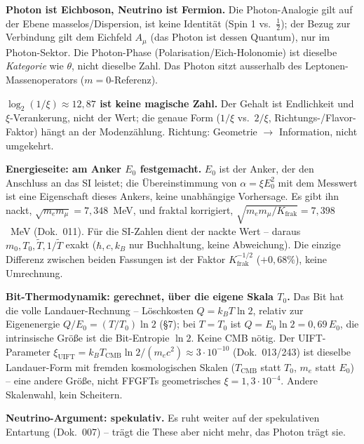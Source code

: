 \textbf{Photon ist Eichboson, Neutrino ist Fermion.} Die Photon-Analogie gilt auf der Ebene
masselos/Dispersion, ist keine Identität (Spin 1 vs.\ $\tfrac12$); der Bezug zur Verbindung gilt dem Eichfeld $A_\mu$ (das Photon ist dessen Quantum), nur im
Photon-Sektor. Die Photon-Phase (Polarisation/Eich-Holonomie) ist dieselbe \emph{Kategorie} wie $\theta$,
nicht dieselbe Zahl. Das Photon sitzt ausserhalb des Leptonen-Massenoperators ($m=0$-Referenz).

\textbf{$\log_2(1/\xi)\approx12{,}87$ ist keine magische Zahl.} Der Gehalt ist Endlichkeit und
$\xi$-Verankerung, nicht der Wert; die genaue Form ($1/\xi$ vs.\ $2/\xi$, Richtungs-/Flavor-Faktor) hängt
an der Modenzählung. Richtung: Geometrie $\to$ Information, nicht umgekehrt.

\textbf{Energieseite: am Anker $E_0$ festgemacht.} $E_0$ ist der Anker, der den Anschluss an das SI
leistet; die Übereinstimmung von $\alpha=\xi E_0^2$ mit dem Messwert ist eine Eigenschaft dieses Ankers,
keine unabhängige Vorhersage. Es gibt ihn nackt, $\sqrt{m_e m_\mu}=7{,}348$~MeV, und fraktal korrigiert,
$\sqrt{m_e m_\mu/K_{\text{frak}}}=7{,}398$~MeV (Dok.~011). Für die SI-Zahlen dient der nackte Wert --
daraus $m_0,T_0,\tilde T,1/\tilde T$ exakt ($\hbar,c,k_B$ nur Buchhaltung, keine Abweichung). Die einzige
Differenz zwischen beiden Fassungen ist der Faktor $K_{\text{frak}}^{-1/2}$ ($+0{,}68\%$), keine
Umrechnung.

\textbf{Bit-Thermodynamik: gerechnet, über die eigene Skala $T_0$.} Das Bit hat die volle
Landauer-Rechnung -- Löschkosten $Q=k_B T\ln2$, relativ zur Eigenenergie $Q/E_0=(T/T_0)\ln2$ (§7); bei
$T=T_0$ ist $Q=E_0\ln2=0{,}69\,E_0$, die intrinsische Größe ist die Bit-Entropie $\ln2$. Keine CMB nötig.
Der UIFT-Parameter $\xi_\text{UIFT}=k_B T_\text{CMB}\ln2/(m_e c^2)\approx3\cdot10^{-10}$ (Dok.~013/243)
ist dieselbe Landauer-Form mit fremden kosmologischen Skalen ($T_\text{CMB}$ statt $T_0$, $m_e$ statt
$E_0$) -- eine andere Größe, nicht FFGFTs geometrisches $\xi=1{,}3\cdot10^{-4}$. Andere Skalenwahl, kein
Scheitern.

\textbf{Neutrino-Argument: spekulativ.} Es ruht weiter auf der spekulativen Entartung (Dok.~007) -- trägt
die These aber nicht mehr, das Photon trägt sie.

